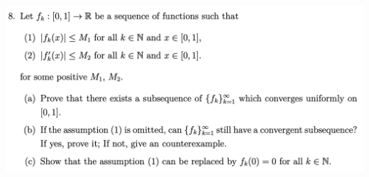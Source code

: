 \documentclass{report}
\begin{document}
\begin{question}{}{}
\includegraphics[height=9cm,width=18cm]{HW1.8}
\end{question}
\end{document}

